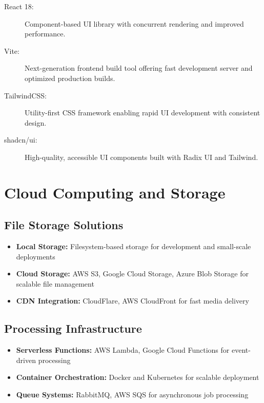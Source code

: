 \begin{description}
    \item[React 18:] Component-based UI library with concurrent rendering and improved performance.
    
    \item[Vite:] Next-generation frontend build tool offering fast development server and optimized production builds.
    
    \item[TailwindCSS:] Utility-first CSS framework enabling rapid UI development with consistent design.
    
    \item[shadcn/ui:] High-quality, accessible UI components built with Radix UI and Tailwind.
\end{description}

\section{Cloud Computing and Storage}

\subsection{File Storage Solutions}

\begin{itemize}
    \item \textbf{Local Storage:} Filesystem-based storage for development and small-scale deployments
    \item \textbf{Cloud Storage:} AWS S3, Google Cloud Storage, Azure Blob Storage for scalable file management
    \item \textbf{CDN Integration:} CloudFlare, AWS CloudFront for fast media delivery
\end{itemize}

\subsection{Processing Infrastructure}

\begin{itemize}
    \item \textbf{Serverless Functions:} AWS Lambda, Google Cloud Functions for event-driven processing
    \item \textbf{Container Orchestration:} Docker and Kubernetes for scalable deployment
    \item \textbf{Queue Systems:} RabbitMQ, AWS SQS for asynchronous job processing
\end{itemize}

